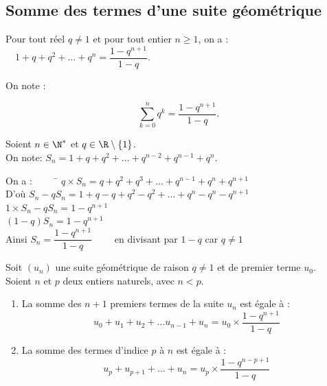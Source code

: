 \documentclass[a4paper,11pt,cours]{nsi} %
\begin{document}
\begin{demonstration}
\end{demonstration}

\subsection*{Somme des termes d'une suite géométrique}

\begin{propriete}
	Pour tout réel $q\neq 1$ et pour tout entier $n\geqslant 1$, on a :
	$\quad 1+q+q^2+\ldots+q^n=\dfrac{1-q^{n+1}}{1-q}.$
	\begin{minipage}{2cm}
		On note :
	\end{minipage}
	\begin{minipage}{6cm}
		$$\sum_{k=0}^n q^k = \frac{1-q^{n+1}}{1-q}.$$
	\end{minipage}
\end{propriete}

\begin{demonstration}
	Soient $n\in\N^*$ et $q\in\R\setminus \left\{1\right\}$.\\
	On note: $S_n=1+q+q^2+...+q^{n-2}+q^{n-1}+q^n$.
	\begin{tabbing}
		On a : $\qquad$ \= $q \times S_n=q+q^2+q^3+...+q^{n-1}+q^n+q^{n+1}$\\[.5em]
		D'où \> $S_n-qS_n = 1 + q-q + q^2-q^2 + ... + q^n-q^n-q^{n+1}$\\[.5em]
			\>	$1\times S_n -qS_n=1-q^{n+1}$\\[.5em]
			\>	$(1-q) S_n=1-q^{n+1}$\\[.5em]
		Ainsi	\>	$S_n=\dfrac{1-q^{n+1}}{1-q} \qquad$ en divisant par $1-q$ car $q\neq 1$
	\end{tabbing}
\end{demonstration}

\begin{propriete}
	Soit $(u_n)$ une suite géométrique de raison $q\neq 1$ et de premier terme $u_0$.\\
	Soient $n$ et $p $ deux entiers naturels, avec $n<p$.
	\begin{enumerate}[label=\textbullet]
		\item La somme des $n+1$ premiers termes de la suite $u_n$ est égale à :
		$$u_0+u_1+u_2+...u_{n-1}+u_n=u_0\times \dfrac{1-q^{n+1}}{1-q}$$
		\item La somme des termes d'indice $p$ à $n$ est égale à :
		$$u_p+u_{p+1}+...+u_n=u_p\times \dfrac{1-q^{n-p+1}}{1-q}$$
	\end{enumerate}
\end{propriete}
\end{document}
